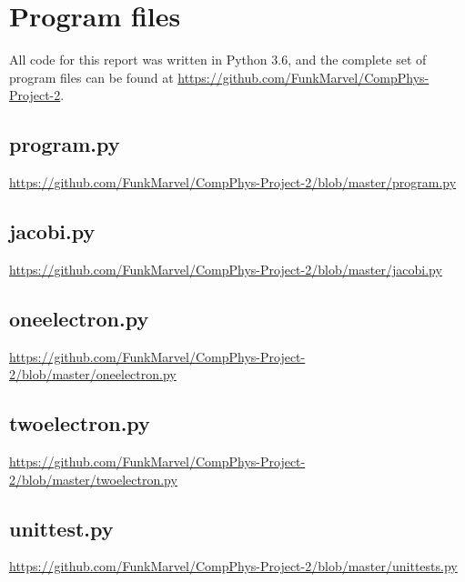 \documentclass[english,notitlepage,reprint]{revtex4-1}  %
\begin{document}
{}

\newpage
\appendix
\section{Program files} \label{A}
All code for this report was written in Python 3.6, and the complete set of program files can be found at \url{https://github.com/FunkMarvel/CompPhys-Project-2}.

\subsection{program.py}\label{A:1}
\url{https://github.com/FunkMarvel/CompPhys-Project-2/blob/master/program.py}

\subsection{jacobi.py}\label{A:2}
\url{https://github.com/FunkMarvel/CompPhys-Project-2/blob/master/jacobi.py}

\subsection{oneelectron.py} \label{A:3}
\url{https://github.com/FunkMarvel/CompPhys-Project-2/blob/master/oneelectron.py}

\subsection{twoelectron.py} \label{A:4}
\url{https://github.com/FunkMarvel/CompPhys-Project-2/blob/master/twoelectron.py}

\subsection{unittest.py}\label{A:5}
\url{https://github.com/FunkMarvel/CompPhys-Project-2/blob/master/unittests.py}
\end{document}
